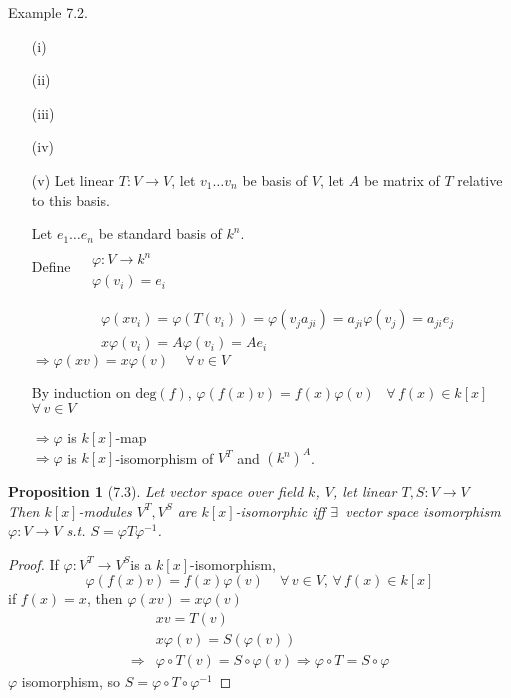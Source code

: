 \documentclass[twoside,landscape]{amsart}
\theoremstyle{plain}
\newtheorem{proposition}{Proposition}
\theoremstyle{definition}
\theoremstyle{remark}
\begin{document}
\begin{multicols*}{2}
Example 7.2.  

\begin{enumerate}
  \item[(i)]
  \item[(ii)]
  \item[(iii)]
  \item[(iv)]
  \item[(v)] Let linear $T:V \to V$, let $v_1 \dots v_n$ be basis of $V$, let $A$ be matrix of $T$ relative to this basis.  

Let $e_1 \dots e_n$ be standard basis of $k^n$.  \\
Define $\begin{aligned} & \quad \\
  & \varphi : V \to k^n \\
  & \varphi(v_i) = e_i \end{aligned}$

\[
\begin{aligned}
  & \varphi(xv_i) = \varphi(T(v_i)) = \varphi(v_j a_{ji} ) = a_{ji} \varphi(v_j) = a_{ji}e_j \\
  & x\varphi(v_i) = A\varphi(v_i) = Ae_i
\end{aligned}
\]
$\Longrightarrow \varphi(xv) = x\varphi(v) \quad \, \forall \, v \in V$

By induction on $\text{deg}(f)$, $\varphi(f(x)v) = f(x) \varphi(v)$ \quad \, $\forall \, f(x) \in k[x]$ \quad \, $\forall \, v \in V$ 

$\Longrightarrow \varphi$ is $k[x]$-map \\
$\Longrightarrow \varphi$ is $k[x]$-isomorphism of $V^T$ and $(k^n)^A$.  

\end{enumerate}


\begin{proposition}[7.3]
Let vector space over field $k$, $V$, let linear $T,S : V \to V$ \\
Then $k[x]$-modules $V^T, V^S$ are $k[x]$-isomorphic iff $\exists \, $ vector space isomorphism $\varphi : V \to V$ s.t. $S = \varphi T \varphi^{-1}$.  
\end{proposition}

\begin{proof}
If $\varphi:V^T \to V^S$is a $k[x]$-isomorphism, 
\[
\varphi(f(x)v) = f(x)\varphi(v) \quad \, \forall \, v \in V , \, \forall \, f(x) \in k[x]
\]
if $f(x)=x$, then $\varphi(xv) = x\varphi(v)$
\[
\begin{aligned}
  & xv = T(v) \\ 
  & x\varphi(v) = S(\varphi(v)) \\ 
 \Longrightarrow & \varphi \circ T(v) = S \circ \varphi(v) \Longrightarrow \varphi \circ T = S \circ \varphi 
\end{aligned}
\]
$\varphi$ isomorphism, so $S = \varphi \circ T \circ \varphi^{-1}$


\end{proof}
\end{multicols*}
\end{document}
